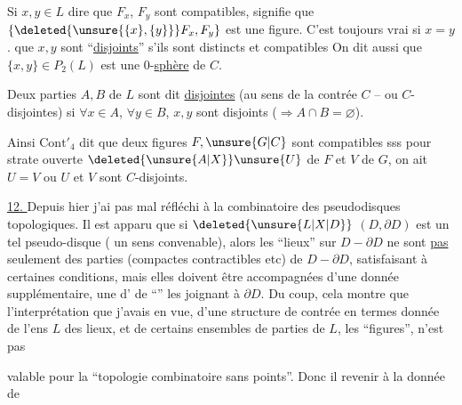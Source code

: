 
 Si $x,y\in L$ dire que $F_x$, $F_y$ sont compatibles, signifie que $\{\deleted{\unsure{\{x\},\{y\}}}F_x,F_y\}$ est  une figure. C'est toujours vrai si $x=y$.   que \deleted{\unsure{$\{$}} $x,y$ sont ``\uline{disjoints}'' s'ils sont distincts et compatibles  On dit aussi  que $\{x,y\}\in P_2(L)$ est une 0-\uline{sphère} de $C$.

Deux parties  $A,B$ de $L$ sont dit \uline{disjointes} (au sens de la contrée $C$ -- ou $C$-disjointes) si $\forall x\in A$, $\forall y\in B$, $x,y$ sont disjoints ($\Longrightarrow A\cap B=\varnothing$).

Ainsi $\mathrm{Cont}'_4$ dit que deux figures $F,\unsure{G|C}$ sont compatibles sss pour  strate ouverte $\deleted{\unsure{A|X}}\unsure{U}$ de $F$ et $V$ de $G$,  on ait $U=V$ ou $U$ et $V$ sont $C$-disjoints.

\uline{12. } Depuis hier j'ai pas mal réfléchi à la combinatoire des pseudodisques topologiques. Il est apparu que si $\deleted{\unsure{L|X|D}}$ $(D,\partial D)$ est un tel pseudo-disque ( un sens convenable), alors les ``lieux'' sur $D-\partial D$ ne sont \uline{pas} seulement des parties (compactes contractibles etc) de $D-\partial D$, satisfaisant à certaines conditions, mais elles doivent être accompagnées d'une donnée supplémentaire, une  d' de ``'' les joignant à $\partial D$. Du coup, cela montre que l'interprétation  que j'avais en vue, d'une structure de contrée en termes  donnée de l'ens $L$ des lieux, et de certains ensembles de parties de $L$, les ``figures'', n'est pas

\unsure{:} valable pour la ``topologie combinatoire sans points''. Donc il  revenir à la donnée de


